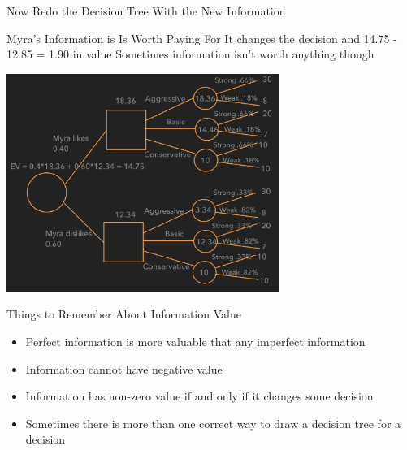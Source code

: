 \documentclass{beamer}\usepackage[]{graphicx}\usepackage[]{color}
\begin{document}
\begin{darkframes}
\begin{frame}[fragile]{Now Redo the Decision Tree With the New Information}
    \end{frame}


    \begin{frame}[fragile]{Myra's Information is Is Worth Paying For}
       It changes the decision and 14.75 - 12.85 = 1.90 in value 
       Sometimes information isn't worth anything though
      \begin{center}
        \includegraphics[width=3.5in]{BevoImperfect} \\
      \end{center}

    \end{frame}


    \begin{frame}[fragile]{Things to Remember About Information Value}
       \fontsize{10}{10}\selectfont   
          \begin{itemize} [<+->]
            \item Perfect information is more valuable that any imperfect information
            \item Information cannot have negative value
            \item Information has non-zero value if and only if it changes some decision
            \item Sometimes there is more than one correct way to draw a decision tree for a decision
          \end{itemize}   
    \end{frame}

  \end{darkframes}
\end{document}
